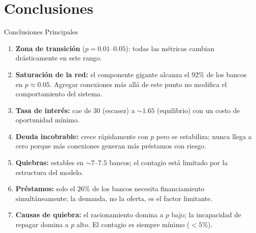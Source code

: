 \documentclass[aspectratio=169,10pt]{beamer}
\begin{document}
\section{Conclusiones}

\begin{frame}{Conclusiones Principales}
  \begin{enumerate}
    \item \textbf{Zona de transición} ($p = 0.01$--$0.05$):
    todas las métricas cambian drásticamente en este rango.
    \item \textbf{Saturación de la red:} el componente gigante
    alcanza el $92\%$ de los bancos en $p \approx 0.05$.
    Agregar conexiones más allá de este punto no
    modifica el comportamiento del sistema.
    \item \textbf{Tasa de interés:} cae de 30 (escasez) a $\sim 1.65$
    (equilibrio) con un costo de oportunidad mínimo.
    \item \textbf{Deuda incobrable:} crece rápidamente con $p$ pero
    se estabiliza; nunca llega a cero porque más conexiones
    generan más préstamos con riesgo.
    \item \textbf{Quiebras:} estables en $\sim 7$--$7.5$ bancos;
    el contagio está limitado por la estructura del modelo.
    \item \textbf{Préstamos:} solo el $26\%$ de los bancos necesita
    financiamiento simultáneamente; la demanda, no la oferta,
    es el factor limitante.
    \item \textbf{Causas de quiebra:} el racionamiento domina
    a $p$ bajo; la incapacidad de repagar domina a $p$ alto.
    El contagio es siempre mínimo ($<5\%$).
  \end{enumerate}
\end{frame}
\end{document}
